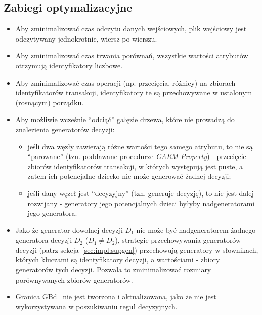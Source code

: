 \documentclass[a4paper,10pt]{article}
\begin{document}
 \subsection{Zabiegi optymalizacyjne}
 \begin{itemize}
  \item Aby zminimalizować czas odczytu danych wejściowych, plik wejściowy jest odczytywany jednokrotnie, wiersz po wierszu.
  \item Aby zminimalizować czas trwania porównań, wszystkie wartości atrybutów otrzymują identyfikatory liczbowe.
  \item Aby zminimalizować czas operacji (np. przecięcia, różnicy) na zbiorach identyfikatorów transakcji, identyfikatory te są przechowywane w ustalonym (rosnącym) porządku.
  \item Aby możliwie wcześnie ``odciąć'' gałęzie drzewa, które nie prowadzą do znalezienia generatorów decyzji:
   \begin{itemize}
    \item jeśli dwa węzły zawierają różne wartości tego samego atrybutu, to nie są ``parowane'' (tzn. poddawane procedurze \emph{GARM-Property}) - przecięcie zbiorów identyfikatorów transakcji, w których występują jest puste, a zatem ich potencjalne dziecko nie może generować żadnej decyzji;
    \item jeśli dany węzeł jest ``decyzyjny'' (tzn. generuje decyzję), to nie jest dalej rozwijany - generatory jego potencjalnych dzieci byłyby nadgeneratorami jego generatora.
   \end{itemize}
  \item Jako że generator dowolnej decyzji $D_1$ nie może być nadgeneratorem żadnego generatora decyzji $D_2$ ($D_1 \ne D_2$), strategie przechowywania generatorów decyzji (patrz sekcja~\ref{sec:impl:supgen}) przechowują generatory w słownikach, których kluczami są identyfikatory decyzji, a wartościami - zbiory generatorów tych decyzji.
  Pozwala to zminimalizować rozmiary porównywanych zbiorów generatorów.
  \item Granica GBd~\cite{grm} nie jest tworzona i aktualizowana, jako że nie jest wykorzystywana w poszukiwaniu reguł decyzyjnych.
 \end{itemize}
\end{document}
